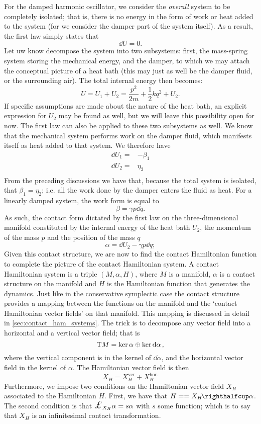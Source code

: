 For the damped harmonic oscillator, we consider the \emph{overall} system to be completely isolated; that is, there is no energy in the form of work or heat added to the system (for we consider the damper part of the system itself). As a result, the first law simply states that
$$ \dd{U} = 0. $$
Let uw know decompose the system into two subsystems: first, the mass-spring system storing the mechanical energy, and the damper, to which we may attach the conceptual picture of a heat bath (this may just as well be the damper fluid, or the surrounding air). The total internal energy then becomes:
$$ U = U_1 + U_2 = \frac{p^2}{2m} + \frac{1}{2}kq^2 + U_2. $$
If specific assumptions are made about the nature of the heat bath, an explicit expression for $U_2$ may be found as well, but we will leave this possibility open for now. The first law can also be applied to these two subsystems as well. We know that the mechanical system performs work on the damper fluid, which manifests itself as heat added to that system. We therefore have
\begin{equation}
    \begin{split}
        \dd{U}_1 =& -\beta_1 \\
        \dd{U}_2 =&  \eta_2 \\
    \end{split}
\end{equation}
From the preceding discussions we have that, because the total system is isolated, that $ \beta_1 = \eta_2 $; i.e. all the work done by the damper enters the fluid as heat. For a linearly damped system, the work form is equal to 
$$ \beta = \gamma p \dd{q}. $$
As such, the contact form dictated by the first law on the three-dimensional manifold constituted by the internal energy of the heat bath $U_2$, the momentum of the mass $p$ and the position of the mass $q$
\begin{equation}
    \alpha = \dd{U}_2 - \gamma p \dd{q};
    \label{eq:dho_contact_form}
\end{equation}
Given this contact structure, we are now to find the contact Hamiltonian function to complete the picture of the contact Hamiltonian system. A contact Hamiltonian system is a triple $(M, \alpha, H)$, where $M$ is a manifold, $\alpha$ is a contact structure on the manifold and $H$ is the Hamiltonian function that generates the dynamics. Just like in the conservative symplectic case the contact structure provides a mapping between the functions on the manifold and the `contact Hamiltonian vector fields' on that manifold. This mapping is discussed in detail in \cref{sec:contact_ham_systems}. The trick is to decompose any vector field into a horizontal and a vertical vector field; that is
$$ \mathrm{T}M = \ker \alpha \oplus \ker \dd{\alpha},$$
where the vertical component is in the kernel of $ \dd{\alpha}$, and the horizontal vector field in the kernel of $ \alpha $. The Hamiltonian vector field is then 
$$ X_H = X_H^\text{ver} + X_H^\text{hor.} $$
Furthermore, we impose two conditions on the Hamiltonian vector field $X_H$ associated to the Hamiltonian $H$. First, we have that $ H = = \intpr{X_H}{\alpha} $. The second condition is that $\lied{X_H}\alpha = s \alpha $ with $s$ some function; which is to say that $X_H$ is an infinitesimal contact transformation. 

